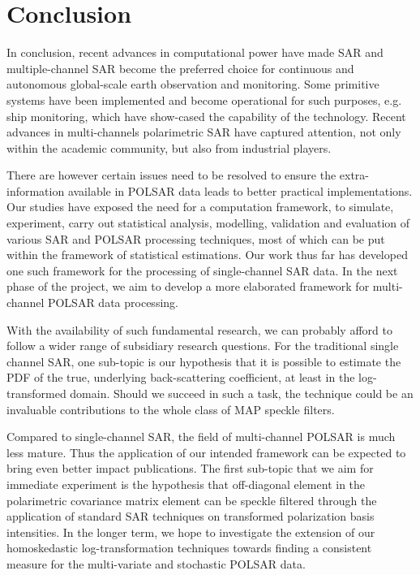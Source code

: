 \section{Conclusion}
\label{sec:conclusion_final}

In conclusion, recent advances in computational power have made SAR and multiple-channel SAR become the preferred choice for continuous and autonomous global-scale earth observation and monitoring.
Some primitive systems have been implemented and become operational for such purposes, e.g. ship monitoring, which have show-cased the capability of the technology.
Recent advances in multi-channels polarimetric SAR have captured attention, not only within the academic community, but also from industrial players.

There are however certain issues need to be resolved to ensure the extra-information available in POLSAR data leads to better practical implementations.
Our studies have exposed the need for a computation framework, to simulate, experiment, carry out statistical analysis, modelling, validation and evaluation of various SAR and POLSAR processing techniques, most of which can be put within the framework of statistical estimations.
Our work thus far has developed one such framework for the processing of single-channel SAR data.
In the next phase of the project, we aim to develop a more elaborated framework for multi-channel POLSAR data processing.

With the availability of such fundamental research, we can probably afford to follow a wider range of subsidiary research questions.
For the traditional single channel SAR, one sub-topic is our hypothesis that it is possible to estimate the PDF of the true, underlying back-scattering coefficient, at least in the log-transformed domain. 
Should we succeed in such a task, the technique could be an invaluable contributions to the whole class of MAP speckle filters.

Compared to single-channel SAR, the field of multi-channel POLSAR is much less mature. 
Thus the application of our intended framework can be expected to bring even better impact publications.
The first sub-topic that we aim for immediate experiment is the hypothesis that off-diagonal element in the polarimetric covariance matrix element can be speckle filtered through the application of standard SAR techniques on transformed polarization basis intensities.
In the longer term, we hope to investigate the extension of our homoskedastic log-transformation techniques towards finding a consistent measure for the multi-variate and stochastic POLSAR data.

